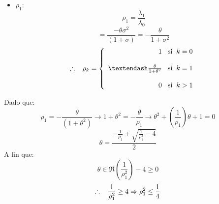 \documentclass[12pt,letterpaper]{article}
\begin{document}
\begin{enumerate}
\begin{itemize}
\begin{itemize}
            \item $\rho_1$:
            \begin{equation*}
                \rho_1 = \frac{\lambda_1}{\lambda_0}
            \end{equation*}
            \begin{equation*}
                = \frac{-\theta \sigma^2}{(1+\sigma)} = -\frac{\theta}{1+\sigma^2}
            \end{equation*}
            \begin{equation*}
                \therefore \hspace{3mm} \rho_k =
                \left \{
                \begin{array}{rcl}
                    1 \hspace{3mm} \text{si}\hspace{2mm} k=0\\ \\
                    –\frac{\theta}{1+\theta^2}\hspace{3mm} \text{si}\hspace{2mm} k=1 \\ \\
                    0 \hspace{3mm} \text{si}\hspace{2mm} k>1
                \end{array}
                \right.
            \end{equation*}
        \end{itemize}
    \end{itemize}
    Dado que:
    \begin{equation*}
        \rho_1 = -\frac{\theta}{(1+\theta^2)} \rightarrow 1+\theta^2 = - \frac{\theta}{\rho_1} \rightarrow \theta^2+\left(\frac{1}{\rho_1}\right)\theta+1 = 0
    \end{equation*}
    \begin{equation*}
        \theta = \frac{-\frac{1}{\rho_1}\mp\sqrt{\frac{1}{\rho_1^2}-4}}{2}
    \end{equation*}
    A fin que:
    \begin{equation*}
        \theta \in \Re \left(\frac{1}{\rho^2_1}\right)-4 \ge 0
    \end{equation*}
    \begin{equation*}
        \therefore \hspace{3mm} \frac{1}{\rho_1^2}\ge 4 \Rightarrow \rho^2_1 \le \frac{1}{4}
    \end{equation*}
    \begin{equation*}

\end{equation*}
\end{enumerate}
\end{document}
